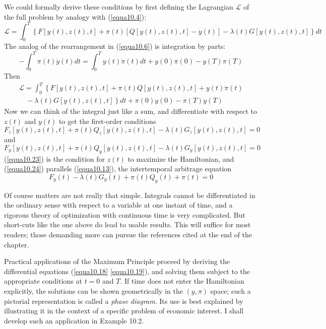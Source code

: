 We could formally derive these conditions by first defining the Lagrangian $\mathcal{L}$ of the full problem by analogy with (\ref{equa10.4}):
\begin{equation} \label{equa10.20}
  \mathcal{L} = \int_0^T \left\{  F[y(t), z(t), t]  + \pi(t) [Q[y(t), z(t), t] - \dot{y}(t)] - \lambda(t) G[y(t), z(t), t]  \right\} dt
\end{equation}
The analog of the rearrangement in (\ref{equa10.6}) is integration by parts:
\begin{equation} \label{equa10.21}
 - \int_{0}^{T} \pi(t) \dot{y}(t) dt = \int_0^T y(t) \dot{\pi}(t)dt + y(0) \pi(0) - y(T)\pi(T)
\end{equation}
Then 
\begin{equation} \label{equa10.22}
\begin{array}{rl}
 \mathcal{L} = \int_0^T \left\{ F[y(t), z(t), t] + \pi(t)Q[y(t), z(t), t] + y(t) \dot{\pi}(t)  \right. \\
\quad  - \lambda(t) G[y(t), z(t), t] \left.   \right\} dt + \pi(0) y(0) - \pi(T) y(T)
\end{array}
\end{equation}
Now we can think of the integral just like a sum, and differentiate with respect to $z(t)$ and $y(t)$ to get the first-order conditions
\begin{equation} \label{equa10.23}
F_z[y(t), z(t), t] + \pi(t)Q_z[y(t), z(t), t] - \lambda(t)G_z[y(t), z(t), t] =0 
\end{equation}
and
\begin{equation} \label{equa10.24}
F_y[y(t), z(t), t] + \pi(t)Q_y[y(t), z(t), t] - \lambda(t)G_y[y(t), z(t), t] =0 
\end{equation}
(\ref{equa10.23}) is the condition for $z(t)$ to maximize the Hamiltonian, and (\ref{equa10.24}) parallels (\ref{equa10.13}), the intertemporal arbitrage equation
\begin{equation} \label{equa10.25}
F_y(t)  - \lambda(t)G_y(t) + \pi(t)Q_y(t) + \dot{\pi}(t) = 0 
\end{equation}

Of course matters are not really that simple. Integrals cannot be differentiated in the ordinary sense with respect to a variable at one instant of time, and a rigorous theory of optimization with continuous time is very complicated. But short-cuts like the one above do lead to usable results. This will suffice for most readers; those demanding more can pursue the references cited at the end of the chapter.

Practical applications of the Maximum Principle proceed by deriving the differential equations (\ref{equa10.18} \ref{equa10.19}), and solving them subject to the appropriate conditions at $t=0$ and $T$. If time does not enter the Hamiltonian explicitly, the solutions can be shown geometrically in the $(y, \pi)$ space; such a pictorial representation is
called a \textit{phase diagram}. Its use is best explained by illustrating it in the context of a specific problem of economic interest. I shall develop such an application in Example 10.2.

